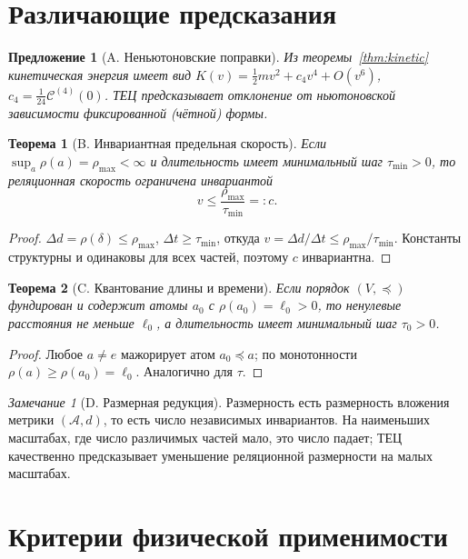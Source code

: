 \documentclass[12pt,a4paper,oneside]{book}
\theoremstyle{definition}
\theoremstyle{plain}
\newtheorem{theorem}{Теорема}[chapter]
\newtheorem{proposition}{Предложение}[chapter]
\theoremstyle{remark}
\newtheorem{remark}{Замечание}[chapter]
\newcommand{\Parts}{\mathcal A}
\newcommand{\Values}{V}
\newcommand{\Vord}{\preceq}
\newcommand{\norm}{\rho}
\newcommand{\ide}{e}
\newcommand{\Cost}{\mathcal C}
\begin{document}
\section{Различающие предсказания}

\begin{proposition}[A. Неньютоновские поправки]
Из теоремы~\ref{thm:kinetic} кинетическая энергия имеет вид
$K(v)=\tfrac12 mv^2+c_4v^4+O(v^6)$, $c_4=\tfrac1{24}\Cost^{(4)}(0)$. ТЕЦ предсказывает
отклонение от ньютоновской зависимости фиксированной (чётной) формы.
\end{proposition}

\begin{theorem}[B. Инвариантная предельная скорость]
Если $\sup_a\norm(a)=\norm_{\max}<\infty$ и длительность имеет минимальный шаг
$\tau_{\min}>0$, то реляционная скорость ограничена инвариантой
\[
v\le\frac{\norm_{\max}}{\tau_{\min}}=:c.
\]
\end{theorem}

\begin{proof}
$\Delta d=\norm(\delta)\le\norm_{\max}$, $\Delta t\ge\tau_{\min}$, откуда
$v=\Delta d/\Delta t\le\norm_{\max}/\tau_{\min}$. Константы структурны и одинаковы для
всех частей, поэтому $c$ инвариантна.
\end{proof}

\begin{theorem}[C. Квантование длины и времени]
Если порядок $(\Values,\Vord)$ фундирован и содержит атомы $a_0$ с
$\norm(a_0)=\ell_0>0$, то ненулевые расстояния не меньше $\ell_0$, а длительность
имеет минимальный шаг $\tau_0>0$.
\end{theorem}

\begin{proof}
Любое $a\neq\ide$ мажорирует атом $a_0\Vord a$; по монотонности
$\norm(a)\ge\norm(a_0)=\ell_0$. Аналогично для $\tau$.
\end{proof}

\begin{remark}[D. Размерная редукция]
Размерность есть размерность вложения метрики $(\Parts,d)$, то есть число независимых
инвариантов. На наименьших масштабах, где число различимых частей мало, это число
падает; ТЕЦ качественно предсказывает уменьшение реляционной размерности на малых
масштабах.
\end{remark}

\section{Критерии физической применимости}
\end{document}
